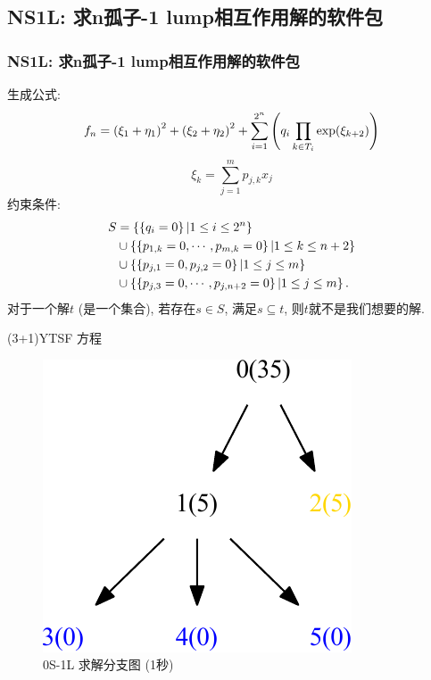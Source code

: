 \subsection{NS1L: 求n孤子-1 lump相互作用解的软件包}
\begin{frame}
\frametitle{NS1L: 求n孤子-1 lump相互作用解的软件包}
生成公式:
\[
    f_n=\left(\xi_1+\eta_1\right)^2+\left(\xi_2+\eta_2\right)^2+\sum_{i=1}^{2^n}\left(q_i\prod_{k \in T_i}{\exp(\xi_{k+2})}\right)
\]
\[
    \xi_k=\sum_{j=1}^m{p_{j,k}x_j}
\]
约束条件:
\[
\begin{aligned}
    S&=\left\{\left\{q_i=0\right\}|1\le i \le 2^n\right\} \\ 
        &\cup \left\{\left\{p_{1,k}=0,\cdots,p_{m,k}=0\right\}|1\le k \le n+2\right\}  \\
        &\cup \left\{\left\{p_{j,1}=0,p_{j,2}=0\right\}|1\le j \le m\right\} \\ 
        &\cup \left\{\left\{p_{j,3}=0,\cdots,p_{j,n+2}=0\right\}|1\le j \le m\right\} . 
\end{aligned}
\]
对于一个解$t$ (是一个集合), 若存在$s\in S$, 满足$s\subseteq t$, 则$t$就不是我们想要的解.
\end{frame}

\begin{frame}
(3+1)YTSF 方程
\begin{figure}
\centering
\includegraphics[width=.5\textwidth]{../paper/fig/0S1L.pdf}
\caption{0S-1L 求解分支图 (1秒)}
\end{figure}
\end{frame}

